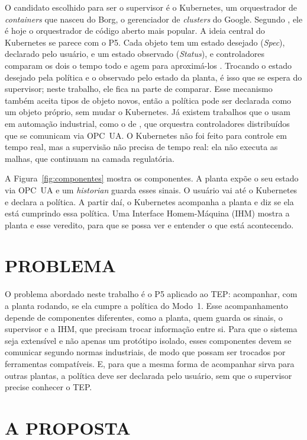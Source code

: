 O candidato escolhido para ser o supervisor é o Kubernetes, um orquestrador de \textit{containers} que nasceu do Borg, o gerenciador de \textit{clusters} do Google. Segundo , ele é hoje o orquestrador de código aberto mais popular. A ideia central do Kubernetes se parece com o P5. Cada objeto tem um estado desejado (\textit{Spec}), declarado pelo usuário, e um estado observado (\textit{Status}), e controladores comparam os dois o tempo todo e agem para aproximá-los \cite{Burns2016}. Trocando o estado desejado pela política e o observado pelo estado da planta, é isso que se espera do supervisor; neste trabalho, ele fica na parte de comparar. Esse mecanismo também aceita tipos de objeto novos, então a política pode ser declarada como um objeto próprio, sem mudar o Kubernetes. Já existem trabalhos que o usam em automação industrial, como o de , que orquestra controladores distribuídos que se comunicam via OPC~UA. O Kubernetes não foi feito para controle em tempo real, mas a supervisão não precisa de tempo real: ela não executa as malhas, que continuam na camada regulatória.

A Figura~\ref{fig:componentes} mostra os componentes. A planta expõe o seu estado via OPC~UA \cite{IEC62541_1} e um \textit{historian} guarda esses sinais. O usuário vai até o Kubernetes e declara a política. A partir daí, o Kubernetes acompanha a planta e diz se ela está cumprindo essa política. Uma Interface Homem-Máquina (IHM) mostra a planta e esse veredito, para que se possa ver e entender o que está acontecendo.


\section{PROBLEMA}
\label{sec:problema}

O problema abordado neste trabalho é o P5 aplicado ao TEP: acompanhar, com a planta rodando, se ela cumpre a política do Modo~1. Esse acompanhamento depende de componentes diferentes, como a planta, quem guarda os sinais, o supervisor e a IHM, que precisam trocar informação entre si. Para que o sistema seja extensível e não apenas um protótipo isolado, esses componentes devem se comunicar segundo normas industriais, de modo que possam ser trocados por ferramentas compatíveis. E, para que a mesma forma de acompanhar sirva para outras plantas, a política deve ser declarada pelo usuário, sem que o supervisor precise conhecer o TEP.

\section{A PROPOSTA}
\label{sec:proposta}

